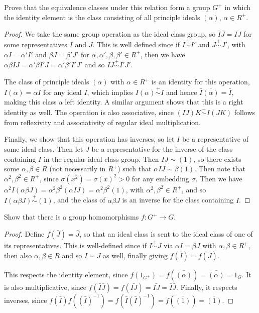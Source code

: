 \documentclass[11pt]{article}
\begin{document}
Prove that the equivalence classes under this relation form a group $G^+$ in which the identity element is the class consisting of all principle ideals $(\alpha)$, $\alpha \in R^+$.
\begin{proof}
  We take the same group operation as the ideal class group, so $\bar I \bar J = \bar{IJ}$ for some representatives $I$ and $J$.
  This is well defined since if $I \overset{+}{\sim} I'$ and $J \overset{+}{\sim} J'$, with $\alpha I = \alpha' I'$ and $\beta J = \beta' J'$ for $\alpha, \alpha', \beta, \beta' \in R^+$, then we have $\alpha \beta I J = \alpha' \beta I' J = \alpha' \beta' I' J'$ and so $IJ \overset{+}{\sim} I'J'$.

  The class of principle ideals $(\alpha)$ with $\alpha \in R^+$ is an identity for this operation, $I(\alpha) = \alpha I$ for any ideal $I$, which implies $I(\alpha) \overset{+}{\sim} I$ and hence $\bar I \bar{(\alpha)} = \bar I$, making this class a left identity.
  A similar argument shows that this is a right identity as well.
  The operation is also associative, since $(IJ)K \overset{+}{\sim} I(JK)$ follows from reflexivity and associativity of regular ideal multiplication.

  Finally, we show that this operation has inverses, so let $I$ be a representative of some ideal class.
  Then let $J$ be a representative for the inverse of the class containing $I$ in the regular ideal class group.
  Then $IJ \sim (1)$, so there exists some $\alpha, \beta \in R$ (not necessarily in $R^+$) such that $\alpha IJ \sim \beta (1)$.
  Then note that $\alpha^2, \beta^2 \in R^+$, since $\sigma(x^2) = \sigma(x)^2 > 0$ for any embedding $\sigma$.
  Then we have $\alpha^2 I (\alpha\beta J) = \alpha^2\beta^2(\alpha IJ) = \alpha^2\beta^2(1)$, with $\alpha^2, \beta^2 \in R^+$, and so $I(\alpha\beta J) \overset{+}{\sim} (1)$, and the class of $\alpha \beta J$ is an inverse for the class containing $I$.
\end{proof}

Show that there is a group homomorphisms $f : G^+ \rightarrow G$.
\begin{proof}
  Define $f(\bar J) = \bar J$, so that an ideal class is sent to the ideal class of one of its representatives.
  This is well-defined since if $I \overset{+}{\sim} J$ via $\alpha I = \beta J$ with $\alpha, \beta \in R^+$, then also $\alpha, \beta \in R$ and so $I \sim J$ as well, finally giving $f(\bar I) = f(\bar J)$.

  This respects the identity element, since $f(1_{G^+}) = f(\bar{(\alpha)}) = \bar{(\alpha)} = 1_G$.
  It is also multiplicative, since $f(\bar I \bar J) = f(\bar{IJ}) = \bar{IJ} = \bar I \bar J$.
  Finally, it respects inverses, since $f(\bar I)f((\bar I)^{-1}) = f(\bar I (\bar I)^{-1}) = f(\bar{(1)}) = \bar{(1)}$.
\end{proof}
\end{document}
